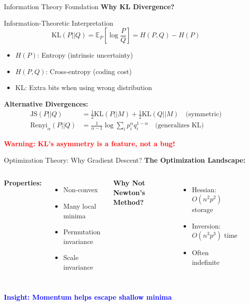 \documentclass[aspectratio=169]{beamer}
\newcommand{\conceptbox}[2]{\colorbox{#1!20}{\textcolor{#1}{\textbf{#2}}}}
\newcommand{\warning}[1]{\conceptbox{red}{Warning: #1}}
\newcommand{\insight}[1]{\conceptbox{blue}{Insight: #1}}
\begin{document}
\begin{frame}{Information Theory Foundation}
\textbf{Why KL Divergence?}

\begin{block}{Information-Theoretic Interpretation}
$$\text{KL}(P||Q) = \mathbb{E}_P\left[\log \frac{P}{Q}\right] = H(P,Q) - H(P)$$
\end{block}

\begin{itemize}
\item $H(P)$: Entropy (intrinsic uncertainty)
\item $H(P,Q)$: Cross-entropy (coding cost)
\item KL: Extra bits when using wrong distribution
\end{itemize}

\textbf{Alternative Divergences:}
\begin{align*}
\text{JS}(P||Q) &= \frac{1}{2}\text{KL}(P||M) + \frac{1}{2}\text{KL}(Q||M) \quad \text{(symmetric)}\\
\text{Renyi}_\alpha(P||Q) &= \frac{1}{\alpha-1}\log\sum_i p_i^\alpha q_i^{1-\alpha} \quad \text{(generalizes KL)}
\end{align*}

\warning{KL's asymmetry is a feature, not a bug!}
\end{frame}

\begin{frame}{Optimization Theory: Why Gradient Descent?}
\textbf{The Optimization Landscape:}

\begin{columns}
\textbf{Properties:}
\begin{itemize}
\item Non-convex
\item Many local minima
\item Permutation invariance
\item Scale invariance
\end{itemize}

\textbf{Why Not Newton's Method?}
\begin{itemize}
\item Hessian: $O(n^2p^2)$ storage
\item Inversion: $O(n^3p^3)$ time
\item Often indefinite
\end{itemize}

\begin{center}
\end{center}
\end{columns}

\insight{Momentum helps escape shallow minima}
\end{frame}
\end{document}
